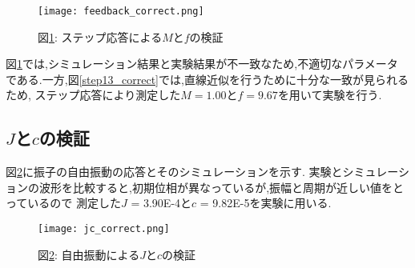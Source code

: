 \begin{figure}[htbp]
    \begin{center}
        \texttt{[image: feedback\_correct.png]}
        \caption{図\ref{feedback_correct}: ステップ応答による$M$と$f$の検証}
        \label{feedback_correct}
    \end{center}
\end{figure}

図\ref{feedback_correct}では,シミュレーション結果と実験結果が不一致なため,不適切なパラメータ
である.一方,図\ref{step13_correct}では,直線近似を行うために十分な一致が見られるため,
ステップ応答により測定した$M = 1.00$と$f = 9.67$を用いて実験を行う.

\subsection{$J$と$c$の検証}
図\ref{jc_correct}に振子の自由振動の応答とそのシミュレーションを示す.
実験とシミュレーションの波形を比較すると,初期位相が異なっているが,振幅と周期が近しい値をとっているので
測定した$J$ = 3.90E-4と$c$ = 9.82E-5を実験に用いる.

\begin{figure}[htbp]
    \begin{center}
        \texttt{[image: jc\_correct.png]}
        \caption{図\ref{jc_correct}: 自由振動による$J$と$c$の検証}
        \label{jc_correct}
    \end{center}
\end{figure}



